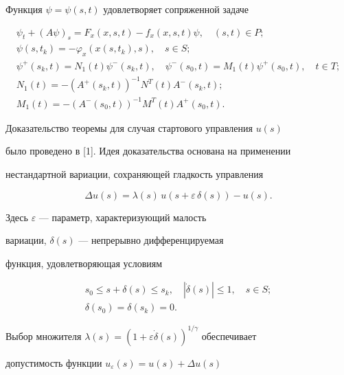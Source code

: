 Функция $\psi = \psi (s,t)$ удовлетворяет сопряженной задаче


\begin{gather*}


\psi_t + (A \psi)_s = F_x (x,s,t)-f_x (x,s,t) \psi, \quad (s,t)\in P;\\


\psi(s,t_k) = - \varphi_x (x (s,t_k),s), \quad s\in S; \\


\psi^+ (s_k,t) = N_1 (t) \psi^- (s_k,t), \quad


\psi^- (s_0,t) = M_1 (t) \psi^+ (s_0,t), \quad t\in T;\\


N_1(t) = -(A^+(s_k,t))^{-1} N^T(t) A^-(s_k,t);\\


M_1(t) = - (A^-(s_0,t))^{-1} M^T(t) A^+(s_0,t).


\end{gather*}





Доказательство теоремы для случая стартового управления $u(s)$


было проведено в [1]. Идея доказательства основана на применении


нестандартной вариации, сохраняющей гладкость управления


$$


\Delta u(s) = \lambda (s) \, u(s + \varepsilon \, \delta (s)) -u(s).


$$


Здесь $\varepsilon$ --- параметр, характеризующий малость


вариации, $\delta (s)$ --- непрерывно дифференцируемая


функция, удовлетворяющая условиям


\begin{gather*}


s_0 \leq s + \delta(s) \leq s_k, \quad |\Dot{\delta} (s)| \leq 1,


\quad s \in S;\\


\delta (s_0) = \delta (s_k) = 0.


\end{gather*}


Выбор множителя $\lambda (s) = (1 +


\varepsilon \Dot{\delta} (s))^{1/\gamma}$ обеспечивает


допустимость функции $ u_\varepsilon (s) = u(s) + \Delta u(s) $


